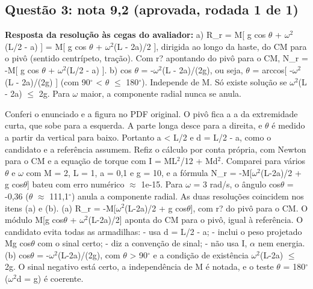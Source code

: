 \documentclass{article}%
\begin{document}
\subsection*{Questão 3: nota 9,2 (aprovada, rodada 1 de 1)}%
\textbf{Resposta da resolução às cegas do avaliador:} a) R\_r = M{[} g cos $\theta$ + $\omega$$^2$(L/2 - a) {]} = M{[} g cos $\theta$ + $\omega$$^2$(L - 2a)/2 {]}, dirigida ao longo da haste, do CM para o pivô (sentido centrípeto, tração). Com r? apontando do pivô para o CM, N\_r = -M{[} g cos $\theta$ + $\omega$$^2$(L/2 - a) {]}.\newline%
\newline%
b) cos $\theta$ = -$\omega$$^2$(L - 2a)/(2g), ou seja, $\theta$ = arccos{[} -$\omega$$^2$(L - 2a)/(2g) {]} (com 90$^\circ$ < $\theta$ $\leq$ 180$^\circ$). Independe de M. Só existe solução se $\omega$$^2$(L - 2a) $\leq$ 2g. Para $\omega$ maior, a componente radial nunca se anula.\par %
Conferi o enunciado e a figura no PDF original. O pivô fica a a da extremidade curta, que sobe para a esquerda. A parte longa desce para a direita, e $\theta$ é medido a partir da vertical para baixo. Portanto a < L/2 e d = L/2 - a, como o candidato e a referência assumem.\newline%
\newline%
Refiz o cálculo por conta própria, com Newton para o CM e a equação de torque com I = ML$^2$/12 + Md$^2$. Comparei para vários $\theta$ e $\omega$ com M = 2, L = 1, a = 0,1 e g = 10, e a fórmula N\_r = -M{[}$\omega$$^2$(L-2a)/2 + g cos$\theta${]} bateu com erro numérico $\approx$ 1e{-}15. Para $\omega$ = 3 rad/s, o ângulo cos$\theta$ = -0,36 ($\theta$ $\approx$ 111,1$^\circ$) anula a componente radial. As duas resoluções coincidem nos itens (a) e (b).\newline%
\newline%
(a) R\_r = -M{[}$\omega$$^2$(L-2a)/2 + g cos$\theta${]}, com r? do pivô para o CM. O módulo M{[}g cos$\theta$ + $\omega$$^2$(L-2a)/2{]} aponta do CM para o pivô, igual à referência. O candidato evita todas as armadilhas:\newline%
{-} usa d = L/2 - a;\newline%
{-} inclui o peso projetado Mg cos$\theta$ com o sinal certo;\newline%
{-} diz a convenção de sinal;\newline%
{-} não usa I, $\alpha$ nem energia.\newline%
\newline%
(b) cos$\theta$ = -$\omega$$^2$(L-2a)/(2g), com $\theta$ > 90$^\circ$ e a condição de existência $\omega$$^2$(L-2a) $\leq$ 2g. O sinal negativo está certo, a independência de M é notada, e o teste $\theta$ = 180$^\circ$ ($\omega$$^2$d = g) é coerente.\newline%
\end{document}
